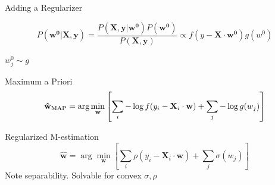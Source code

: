 \documentclass[pdf]{beamer}
\begin{document}
\begin{frame}[t]{Adding a Regularizer}

    \begin{equation*}
        P(\mathbf{w^0}|\mathbf{X},\mathbf{y}) = \frac{P(\mathbf{X},\mathbf{y}|\mathbf{w^0})P(\mathbf{w^0})}{P(\mathbf{X},\mathbf{y})}\propto f(y-\mathbf{X}\cdot \mathbf{w^0})g(w^0)
    \end{equation*}
    
    $w^0_j \sim g$

    \begin{block}{Maximum a Priori}
        \begin{equation*}
            \small{\mathbf{\hat{w}_{\text{MAP}}} =\arg\min_{\mathbf{w}}{\left[\sum_i{-\log f(y_i - \mathbf{X}_i\cdot \mathbf{w})} +\sum_j{-\log{g(w_j)}}\right]}}
        \end{equation*}
    \end{block}

    \begin{block}{Regularized M-estimation}
    \begin{equation*}
        \mathbf{\hat{w}}=\arg \min_{\mathbf{w}}{\left[ \sum_{i} {\rho\left( y_i - \mathbf{X}_{i} \cdot \mathbf{w}\right)} + \sum_j{\sigma(w_j)}\right]}
    \end{equation*}
    Note separability. Solvable for convex $\sigma,\rho$
    \end{block}

\end{frame}
\end{document}
